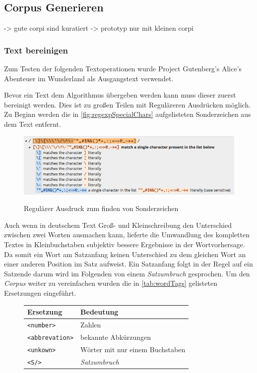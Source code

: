 \subsection{Corpus Generieren}
    -> gute corpi sind kuratiert 
    -> prototyp nur mit kleinen corpi
        
    \subsubsection*{Text bereinigen}
    
        Zum Testen der folgenden Textoperationen wurde Project Gutenberg's Alice's Abenteuer im Wunderland \parencite{gutenberg:alice} als Ausgangstext verwendet.
        
        Bevor ein Text dem Algorithmus übergeben werden kann muss dieser zuerst bereinigt werden. Dies ist zu großen Teilen mit Reguläreren Ausdrücken möglich. Zu Beginn werden die in \autoref{fig:regexpSpecialChars} aufgelisteten Sonderzeichen aus dem Text entfernt.
            
        \begin{figure}[H]
            \centering
            \includegraphics[width=0.8\linewidth]{images/regexpSpecialChars.png}
  			\caption{Regulärer Ausdruck zum finden von Sonderzeichen} \parencite{regex101:specialChars}
			\label{fig:regexpSpecialChars}
		\end{figure}
            
		Auch wenn in deutschem Text Groß- und Kleinschreibung den Unterschied zwischen zwei Worten ausmachen kann, lieferte die Umwandlung des kompletten Textes in Kleinbuchstaben subjektiv bessere Ergebnisse in der Wortvorhersage. Da somit ein Wort am Satzanfang keinen Unterschied zu dem gleichen Wort an einer anderen Position im Satz aufweist. Ein Satzanfang folgt in der Regel auf ein Satzende darum wird im Folgenden von einem \emph{Satzumbruch} gesprochen. Um den \emph{Corpus} weiter zu vereinfachen wurden die in \autoref{tab:wordTags} gelisteten Ersetzungen eingeführt.
        
		\begin{figure}[H]
			\centering
                
			\begin{tabular}{ l | l }
                Ersetzung & Bedeutung \\ \hline \hline
                \texttt{<number>} & Zahlen \\ \hline
                \texttt{<abbrevation>} & bekannte Abkürzungen \\ \hline
                \texttt{<unkown>} & Wörter mit nur einem Buchstaben \\ \hline
                \texttt{<S/>} & \emph{Satzumbruch}
            \end{tabular}
            \caption{ }
			\label{tab:wordTags}
		\end{figure}
            
